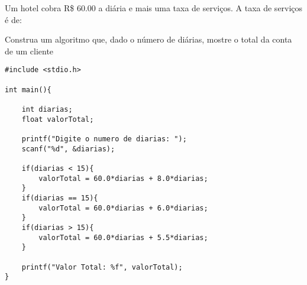 
\question[10]

Um hotel cobra R\$ 60.00 a diária e mais uma taxa de serviços. A taxa de serviços é de:


Construa um algoritmo que, dado o número de diárias, mostre o total da conta de um cliente

\begin{solution}
	\begin{lstlisting}
#include <stdio.h>

int main(){

	int diarias;
	float valorTotal;
	
	printf("Digite o numero de diarias: ");
	scanf("%d", &diarias);
	
	if(diarias < 15){
		valorTotal = 60.0*diarias + 8.0*diarias;
	}
	if(diarias == 15){
		valorTotal = 60.0*diarias + 6.0*diarias;
	}
	if(diarias > 15){
		valorTotal = 60.0*diarias + 5.5*diarias;
	}
	
	printf("Valor Total: %f", valorTotal);
}
\end{lstlisting}
\end{solution}
